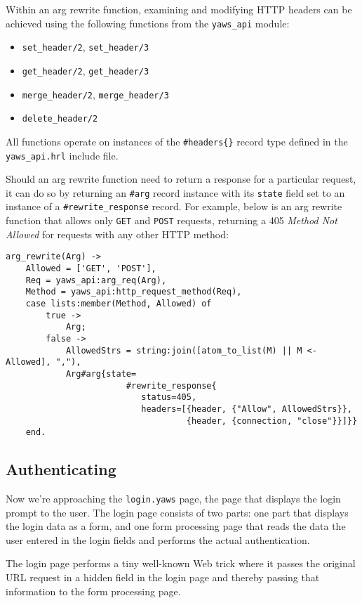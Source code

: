 \documentclass[11pt,oneside,english]{book}
\begin{document}
Within an arg rewrite function, examining and modifying HTTP headers can be
achieved using the following functions from the \verb+yaws_api+ module:

\begin{itemize}
\item \verb+set_header/2+, \verb+set_header/3+
\item \verb+get_header/2+, \verb+get_header/3+
\item \verb+merge_header/2+, \verb+merge_header/3+
\item \verb+delete_header/2+
\end{itemize}

All functions operate on instances of the \verb+#headers{}+ record type
defined in the \verb+yaws_api.hrl+ include file.

Should an arg rewrite function need to return a response for a particular
request, it can do so by returning an \verb+#arg+ record instance with its
\verb+state+ field set to an instance of a \verb+#rewrite_response+
record. For example, below is an arg rewrite function that allows only
\verb+GET+ and \verb+POST+ requests, returning a 405 \emph{Method Not
  Allowed} for requests with any other HTTP method:

\begin{verbatim}
arg_rewrite(Arg) ->
    Allowed = ['GET', 'POST'],
    Req = yaws_api:arg_req(Arg),
    Method = yaws_api:http_request_method(Req),
    case lists:member(Method, Allowed) of
        true ->
            Arg;
        false ->
            AllowedStrs = string:join([atom_to_list(M) || M <- Allowed], ","),
            Arg#arg{state=
                        #rewrite_response{
                           status=405,
                           headers=[{header, {"Allow", AllowedStrs}},
                                    {header, {connection, "close"}}]}}
    end.
\end{verbatim}

\subsection{Authenticating}

Now we're approaching the \verb+login.yaws+ page, the page that
displays the login prompt to the user. The login page consists of two
parts: one part that displays the login data as a form, and one form
processing page that reads the data the user entered in the login
fields and performs the actual authentication.

The login page performs a tiny well-known Web trick where it passes
the original URL request in a hidden field in the login page and
thereby passing that information to the form processing page.
\end{document}

